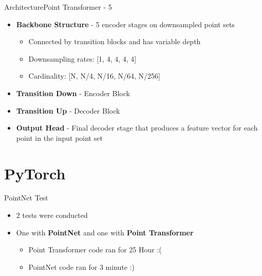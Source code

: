 \documentclass{beamer}
\begin{document}
        \begin{frame}{Architecture}{Point Transformer - 5} 
			\begin{itemize}
				\item \textbf{Backbone Structure} - 5 encoder stages on downsampled point sets
                \begin{itemize}
    				\item Connected by transition blocks and has variable depth
                    \item Downsampling rates: [1, 4, 4, 4, 4]
                    \item Cardinality: [N, N/4, N/16, N/64, N/256]
			    \end{itemize}
                \item \textbf{Transition Down} - Encoder Block
                \item \textbf{Transition Up} - Decoder Block
                \item \textbf{Output Head} - Final decoder stage that  produces a feature vector for each point in the input point set
			\end{itemize}
        \end{frame}
    
	\section{PyTorch}
        \begin{frame}{PointNet Test}
            \begin{itemize}
                \item 2 tests were conducted
                \item One with \textbf{PointNet} and one with \textbf{Point Transformer}
                \begin{itemize}
                    \item Point Transformer code ran for 25 Hour :(
                    \item PointNet code ran for 3 minute :) 
                \end{itemize}
            \end{itemize}
        \end{frame}
\end{document}

